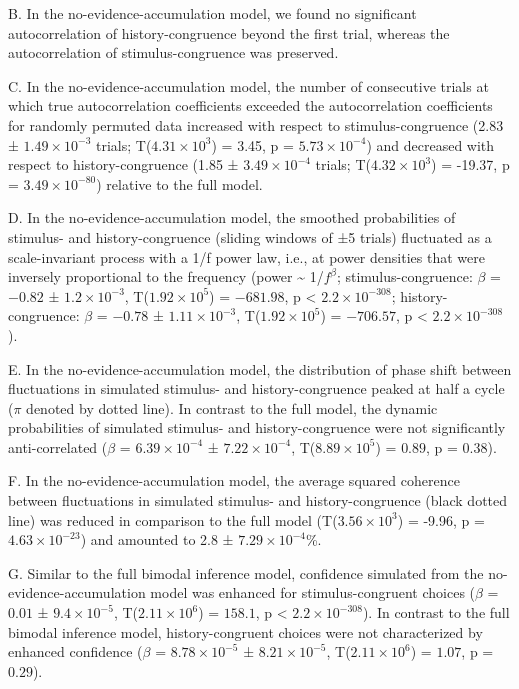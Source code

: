 \documentclass[
]{article}
\begin{document}
\begin{itemize}
B. In the no-evidence-accumulation model, we found no significant
autocorrelation of history-congruence beyond the first trial, whereas
the autocorrelation of stimulus-congruence was preserved.

C. In the no-evidence-accumulation model, the number of consecutive
trials at which true autocorrelation coefficients exceeded the
autocorrelation coefficients for randomly permuted data increased with
respect to stimulus-congruence (2.83 ± \ensuremath{1.49\times 10^{-3}}
trials; T(\ensuremath{4.31\times 10^{3}}) = 3.45, p =
\(\ensuremath{5.73\times 10^{-4}}\)) and decreased with respect to
history-congruence (1.85 ± \ensuremath{3.49\times 10^{-4}} trials;
T(\ensuremath{4.32\times 10^{3}}) = -19.37, p =
\(\ensuremath{3.49\times 10^{-80}}\)) relative to the full model.

D. In the no-evidence-accumulation model, the smoothed probabilities of
stimulus- and history-congruence (sliding windows of ±5 trials)
fluctuated as a scale-invariant process with a 1/f power law, i.e., at
power densities that were inversely proportional to the frequency (power
\textasciitilde{} 1/\(f^\beta\); stimulus-congruence: \(\beta\) =
\(-0.82\) ± \(\ensuremath{1.2\times 10^{-3}}\),
T(\(\ensuremath{1.92\times 10^{5}}\)) = \(-681.98\), p < \(\ensuremath{2.2\times 10^{-308}}\);
history-congruence: \(\beta\) = \(-0.78\) ±
\(\ensuremath{1.11\times 10^{-3}}\),
T(\(\ensuremath{1.92\times 10^{5}}\)) = \(-706.57\), p < \(\ensuremath{2.2\times 10^{-308}}\)).

E. In the no-evidence-accumulation model, the distribution of phase
shift between fluctuations in simulated stimulus- and history-congruence
peaked at half a cycle (\(\pi\) denoted by dotted line). In contrast to
the full model, the dynamic probabilities of simulated stimulus- and
history-congruence were not significantly anti-correlated (\(\beta\) =
\(\ensuremath{6.39\times 10^{-4}}\) ±
\(\ensuremath{7.22\times 10^{-4}}\),
T(\(\ensuremath{8.89\times 10^{5}}\)) = \(0.89\), p = \(0.38\)).

F. In the no-evidence-accumulation model, the average squared coherence
between fluctuations in simulated stimulus- and history-congruence
(black dotted line) was reduced in comparison to the full model
(T(\ensuremath{3.56\times 10^{3}}) = -9.96, p =
\(\ensuremath{4.63\times 10^{-23}}\)) and amounted to 2.8 ±
\ensuremath{7.29\times 10^{-4}}\%.

G. Similar to the full bimodal inference model, confidence simulated
from the no-evidence-accumulation model was enhanced for
stimulus-congruent choices (\(\beta\) = \(0.01\) ±
\(\ensuremath{9.4\times 10^{-5}}\),
T(\(\ensuremath{2.11\times 10^{6}}\)) = \(158.1\), p < \(\ensuremath{2.2\times 10^{-308}}\)). In
contrast to the full bimodal inference model, history-congruent choices
were not characterized by enhanced confidence (\(\beta\) =
\(\ensuremath{8.78\times 10^{-5}}\) ±
\(\ensuremath{8.21\times 10^{-5}}\),
T(\(\ensuremath{2.11\times 10^{6}}\)) = \(1.07\), p = \(0.29\)).


\end{itemize}
\end{document}
